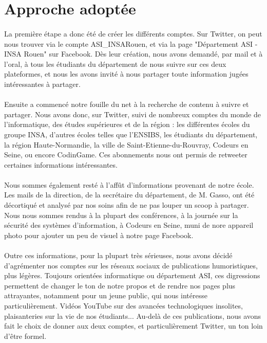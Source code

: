 \section{Approche adoptée}

\paragraph{}
La première étape a donc été de créer les différents comptes. Sur Twitter, on peut nous trouver via le compte ASI\_INSARouen, et via la page "Département ASI - INSA Rouen" sur Facebook. Dès leur création, nous avons demandé, par mail et à l'oral, à tous les étudiants du département de nous suivre sur ces deux plateformes, et nous les avons invité à nous partager toute information jugées intéressantes à partager.

\paragraph{}
Ensuite a commencé notre fouille du net à la recherche de contenu à suivre et partager. Nous avons donc, sur Twitter, suivi de nombreux comptes du monde de l'informatique, des études supérieures et de la région : les différentes écoles du groupe INSA, d'autres écoles telles que l'ENSIBS, les étudiants du département, la région Haute-Normandie, la ville de Saint-Etienne-du-Rouvray, Codeurs en Seine, ou encore CodinGame. Ces abonnements nous ont permis de retweeter certaines informations intéressantes. 

\paragraph{}
Nous sommes également resté à l'affût d'informations provenant de notre école. Les mails de la direction, de la secrétaire du département, de M. Gasso, ont été décortiqué et analysé par nos soins afin de ne pas louper un scoop à partager. Nous nous sommes rendus à la plupart des conférences, à la journée sur la sécurité des systèmes d'information, à Codeurs en Seine, muni de nore appareil photo pour ajouter un peu de visuel à notre page Facebook.

\paragraph{}
Outre ces informations, pour la plupart très sérieuses, nous avons décidé d'agrémenter nos comptes sur les réseaux sociaux de publications humoristiques, plus légères. Toujours orientées informatique ou département ASI, ces digressions permettent de changer le ton de notre propos et de rendre nos pages plus attrayantes, notamment pour un jeune public, qui nous intéresse particulièrement. Vidéos YouTube sur des avancées technologiques insolites, plaisanteries sur la vie de nos étudiants... Au-delà de ces publications, nous avons fait le choix de donner aux deux comptes, et particulièrement Twitter, un ton loin d'être formel.